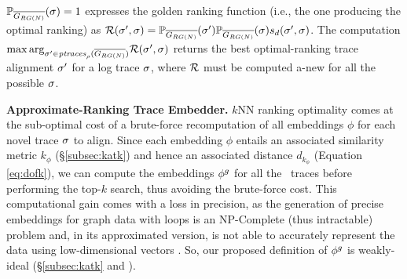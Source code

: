 {$\probskip{\logtrace}=1$ expresses the golden ranking function (i.e., the one producing the optimal ranking) as $\goldenrank(\nonlogtrace,\logtrace)=\probskip{\nonlogtrace} \probskip{\logtrace} s_d(\nonlogtrace,\logtrace)$. The computation ${\max\arg}_{\nonlogtrace\in \WCal{\pmin}{n}} \goldenrank(\nonlogtrace, {\logtrace})$ returns the best optimal-ranking trace alignment $\nonlogtrace$ for a log trace $\logtrace$, where $\goldenrank$ must be computed a-new for all the possible $\logtrace$.
	
	
\vspace{+0.2cm}	
\noindent
\textbf{Approximate-Ranking Trace Embedder.}\label{subsec:ate}
$k$NN ranking optimality comes at the sub-optimal cost of a brute-force recomputation of all embeddings $\phi$
for each novel trace $\logtrace$ to align.
Since each embedding $\phi$ entails an associated similarity metric $k_\phi$ (\S\ref{subsec:katk}) and hence an associated
distance $d_{k_\phi}$ (Equation \ref{eq:dofk}), we can compute the embeddings $\gorgembed$ for all the \unravelled\ traces
before performing the top-$k$ search, thus avoiding the brute-force cost. This computational gain comes with a loss in precision, as the generation of precise embeddings for graph data with loops is an NP-Complete (thus intractable) problem \cite{GartnerFW03} and, in its approximated version, is not able to accurately represent the data using low-dimensional vectors \cite{Seshadhri5631}. So, our proposed definition of $\gorgembed$ is  weakly-ideal (\S\ref{subsec:katk} and \cite{Gartner03}).

}
